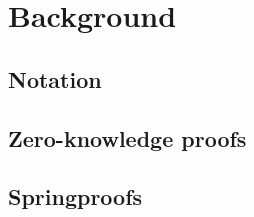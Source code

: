 
\section{Background}\label{sec:background}


\subsection{Notation}\label{sec:background-notation}




\subsection{Zero-knowledge proofs}\label{sec:background-zkps}




\subsection{Springproofs}\label{sec:background-springproofs}



